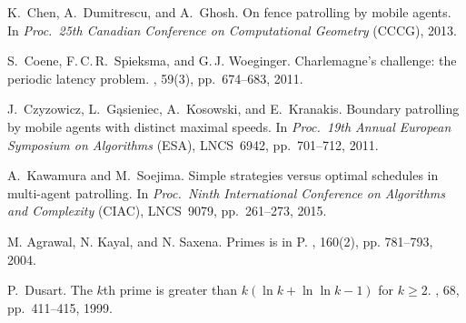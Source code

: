 \begin{thebibliography}{1}

K.~Chen, A.~Dumitrescu, and A.~Ghosh.
\newblock On fence patrolling by mobile agents.
\newblock In {\it Proc.\ 25th Canadian Conference on Computational Geometry} (CCCG), 2013.




S.~Coene, F.\,C.\,R.~Spieksma, and G.\,J. Woeginger.
\newblock Charlemagne's challenge: the periodic latency problem.
, 59(3), pp.~674--683, 2011.


J.~Czyzowicz, L.~G{\k{a}}sieniec, A.~Kosowski, and E.~Kranakis.
\newblock Boundary patrolling by mobile agents with distinct maximal speeds.
\newblock In {\it Proc.\ 19th Annual European Symposium on Algorithms} (ESA), LNCS~6942, pp.~701--712, 2011. 




A.~Kawamura and M.~Soejima.
\newblock Simple strategies versus optimal schedules in multi-agent patrolling.
\newblock In \emph{Proc.\ Ninth International Conference on Algorithms and Complexity} (CIAC), LNCS~9079, pp.~261--273, 2015.



M. Agrawal, N. Kayal, and N. Saxena.
\newblock Primes is in P.
, 160(2), pp. 781--793, 2004.

P.~Dusart.
\newblock The $k$th prime is greater than $k (\ln k + \ln \ln k - 1)$ for $k \geq 2$.
, 68, pp.~411--415, 1999.


\end{thebibliography}
